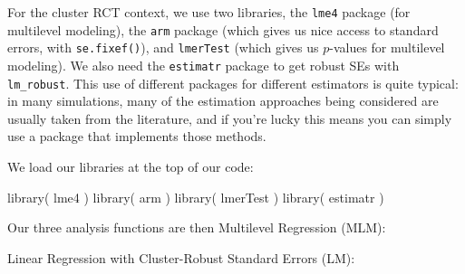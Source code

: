 \documentclass[
]{book}
\newenvironment{Shaded}{\begin{snugshade}}{\end{snugshade}}
\newcommand{\AttributeTok}[1]{\textcolor[rgb]{0.77,0.63,0.00}{#1}}
\newcommand{\ControlFlowTok}[1]{\textcolor[rgb]{0.13,0.29,0.53}{\textbf{#1}}}
\newcommand{\DecValTok}[1]{\textcolor[rgb]{0.00,0.00,0.81}{#1}}
\newcommand{\FunctionTok}[1]{\textcolor[rgb]{0.00,0.00,0.00}{#1}}
\newcommand{\NormalTok}[1]{#1}
\newcommand{\OtherTok}[1]{\textcolor[rgb]{0.56,0.35,0.01}{#1}}
\newcommand{\SpecialCharTok}[1]{\textcolor[rgb]{0.00,0.00,0.00}{#1}}
\newcommand{\StringTok}[1]{\textcolor[rgb]{0.31,0.60,0.02}{#1}}
\begin{document}
For the cluster RCT context, we use two libraries, the \texttt{lme4} package (for multilevel modeling), the \texttt{arm} package (which gives us nice access to standard errors, with \texttt{se.fixef()}), and \texttt{lmerTest} (which gives us \(p\)-values for multilevel modeling).
We also need the \texttt{estimatr} package to get robust SEs with \texttt{lm\_robust}.
This use of different packages for different estimators is quite typical: in many simulations, many of the estimation approaches being considered are usually taken from the literature, and if you're lucky this means you can simply use a package that implements those methods.

We load our libraries at the top of our code:

\begin{Shaded}
\begin{Highlighting}[]
\FunctionTok{library}\NormalTok{( lme4 )}
\FunctionTok{library}\NormalTok{( arm )}
\FunctionTok{library}\NormalTok{( lmerTest )}
\FunctionTok{library}\NormalTok{( estimatr )}
\end{Highlighting}
\end{Shaded}

Our three analysis functions are then Multilevel Regression (MLM):

\begin{Shaded}
\end{Shaded}

Linear Regression with Cluster-Robust Standard Errors (LM):
\end{document}

